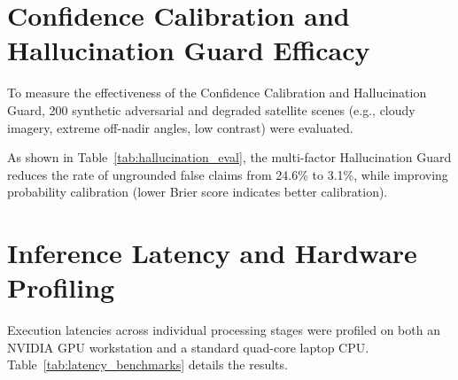 \documentclass[12pt,a4paper]{report}
\begin{document}
\section{Confidence Calibration and Hallucination Guard Efficacy}
To measure the effectiveness of the Confidence Calibration and Hallucination Guard, 200 synthetic adversarial and degraded satellite scenes (e.g., cloudy imagery, extreme off-nadir angles, low contrast) were evaluated.

\begin{table}[htbp]
\centering
\caption{Impact of Hallucination Guard on Verification Reliability}\label{tab:hallucination_eval}
\end{table}

As shown in Table~\ref{tab:hallucination_eval}, the multi-factor Hallucination Guard reduces the rate of ungrounded false claims from 24.6\% to 3.1\%, while improving probability calibration (lower Brier score indicates better calibration).

\section{Inference Latency and Hardware Profiling}
Execution latencies across individual processing stages were profiled on both an NVIDIA GPU workstation and a standard quad-core laptop CPU. Table~\ref{tab:latency_benchmarks} details the results.
\end{document}

